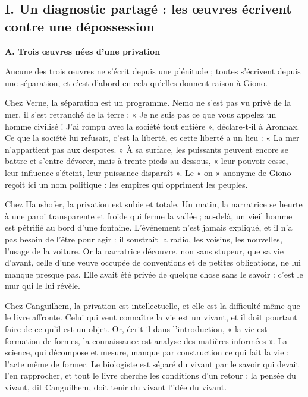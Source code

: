 \documentclass[11pt,a4paper]{article}
\begin{document}
\hypertarget{i.-un-diagnostic-partaguxe9-les-ux153uvres-uxe9crivent-contre-une-duxe9possession}{%
\subsection{I. Un diagnostic partagé : les œuvres écrivent contre une dépossession}\label{i.-un-diagnostic-partaguxe9-les-ux153uvres-uxe9crivent-contre-une-duxe9possession}}

\textbf{A. Trois œuvres nées d'une privation}

Aucune des trois œuvres ne s'écrit depuis une plénitude ; toutes s'écrivent depuis une séparation, et c'est d'abord en cela qu'elles donnent raison à Giono.

Chez Verne, la séparation est un programme. Nemo ne s'est pas vu privé de la mer, il s'est retranché de la terre : « Je ne suis pas ce que vous appelez un homme civilisé ! J'ai rompu avec la société tout entière », déclare-t-il à Aronnax. Ce que la société lui refusait, c'est la liberté, et cette liberté a un lieu : « La mer n'appartient pas aux despotes. » À sa surface, les puissants peuvent encore se battre et s'entre-dévorer, mais à trente pieds au-dessous, « leur pouvoir cesse, leur influence s'éteint, leur puissance disparaît ». Le « on » anonyme de Giono reçoit ici un nom politique : les empires qui oppriment les peuples.

Chez Haushofer, la privation est subie et totale. Un matin, la narratrice se heurte à une paroi transparente et froide qui ferme la vallée ; au-delà, un vieil homme est pétrifié au bord d'une fontaine. L'événement n'est jamais expliqué, et il n'a pas besoin de l'être pour agir : il soustrait la radio, les voisins, les nouvelles, l'usage de la voiture. Or la narratrice découvre, non sans stupeur, que sa vie d'avant, celle d'une veuve occupée de conventions et de petites obligations, ne lui manque presque pas. Elle avait été privée de quelque chose sans le savoir : c'est le mur qui le lui révèle.

Chez Canguilhem, la privation est intellectuelle, et elle est la difficulté même que le livre affronte. Celui qui veut connaître la vie est un vivant, et il doit pourtant faire de ce qu'il est un objet. Or, écrit-il dans l'introduction, « la vie est formation de formes, la connaissance est analyse des matières informées ». La science, qui décompose et mesure, manque par construction ce qui fait la vie : l'acte même de former. Le biologiste est séparé du vivant par le savoir qui devait l'en rapprocher, et tout le livre cherche les conditions d'un retour : la pensée du vivant, dit Canguilhem, doit tenir du vivant l'idée du vivant.
\end{document}
